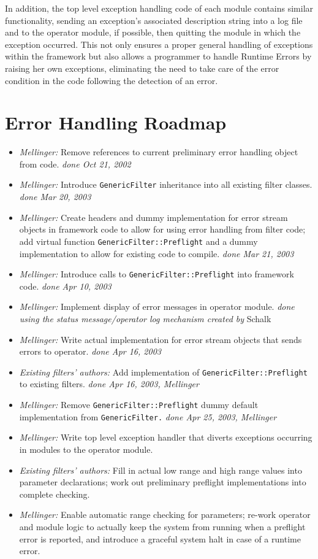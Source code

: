 \documentclass[12pt,a4paper]{article}
\begin{document}
In addition, the top level exception handling code
of each module contains similar functionality,
sending an exception's associated description string into
a log file and to the operator module, if possible, then
quitting the module in which the exception occurred.
This not only ensures
a proper general handling of exceptions within the framework but
also allows a programmer to handle {Runtime Errors} by raising
her own exceptions, eliminating the need to take care of the error
condition in the code following the detection of an error.

\pagebreak
\section{Error Handling Roadmap}
\begin{flushleft}
\begin{itemize}
\item \textit{Mellinger:} Remove references to current preliminary error handling
object from code.
  \textit{done Oct 21, 2002}
\item \textit{Mellinger:} Introduce \texttt{GenericFilter} inheritance into all
existing filter classes.
  \textit{done Mar 20, 2003}
\item \textit{Mellinger:} Create headers and dummy implementation for error stream
objects in framework code to allow for using error handling from
filter code; add virtual function \texttt{GenericFilter::Preflight}
and a dummy implementation to allow for existing code to compile.
  \textit{done Mar 21, 2003}
\item \textit{Mellinger:} Introduce calls to \texttt{GenericFilter::Preflight} into
framework code.
  \textit{done Apr 10, 2003}
\item \textit{Mellinger:} Implement display of error messages in operator module.
  \textit{done using the status message/operator log mechanism created by} Schalk 
\item \textit{Mellinger:} Write actual implementation for error stream objects that
sends errors to operator.
  \textit{done Apr 16, 2003}
\item \textit{Existing filters' authors:} Add implementation of \texttt{GenericFilter::Preflight} to existing filters.
  \textit{done Apr 16, 2003, Mellinger}
\item \textit{Mellinger:} Remove \texttt{GenericFilter::Preflight} dummy default implementation from \texttt{GenericFilter.}
  \textit{done Apr 25, 2003, Mellinger}
\item \textit{Mellinger:} Write top level exception handler that diverts exceptions
occurring in modules to the operator module.
\item \textit{Existing filters' authors:} Fill in actual low range and high range 
values into parameter declarations; work out preliminary preflight implementations 
into complete checking.
\item \textit{Mellinger:} Enable automatic range checking for parameters; re-work operator and module logic to actually keep the system from running when a preflight error is
reported, and introduce a graceful system halt in case of a runtime error.
\end{itemize}
\end{flushleft}
\end{document}

